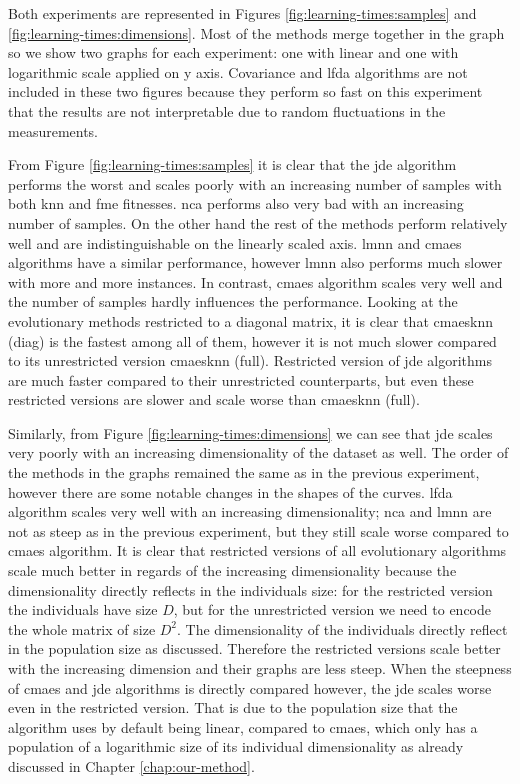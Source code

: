 \documentclass[12pt,a4paper]{report}
\begin{document}
Both experiments are represented in Figures \ref{fig:learning-times:samples} and \ref{fig:learning-times:dimensions}. Most of the methods merge together in the graph so we show two graphs for each experiment: one with linear and one with logarithmic scale applied on y axis. Covariance and \ac{lfda} algorithms are not included in these two figures because they perform so fast on this experiment that the results are not interpretable due to random fluctuations in the measurements.

From Figure \ref{fig:learning-times:samples} it is clear that the \ac{jde} algorithm performs the worst and scales poorly with an increasing number of samples with both \ac{knn} and \ac{fme} fitnesses. \ac{nca} performs also very bad with an increasing number of samples. On the other hand the rest of the methods perform relatively well and are indistinguishable on the linearly scaled axis. \ac{lmnn} and \ac{cmaes} algorithms have a similar performance, however \ac{lmnn} also performs much slower with more and more instances. In contrast, \ac{cmaes} algorithm scales very well and the number of samples hardly influences the performance. Looking at the evolutionary methods restricted to a diagonal matrix, it is clear that \ac{cmaesknn} (diag) is the fastest among all of them, however it is not much slower compared to its unrestricted version \ac{cmaesknn} (full). Restricted version of \ac{jde} algorithms are much faster compared to their unrestricted counterparts, but even these restricted versions are slower and scale worse than \ac{cmaesknn} (full).


Similarly, from Figure \ref{fig:learning-times:dimensions} we can see that \ac{jde} scales very poorly with an increasing dimensionality of the dataset as well. The order of the methods in the graphs remained the same as in the previous experiment, however there are some notable changes in the shapes of the curves. \ac{lfda} algorithm scales very well with an increasing dimensionality; \ac{nca} and \ac{lmnn} are not as steep as in the previous experiment, but they still scale worse compared to \ac{cmaes} algorithm. It is clear that restricted versions of all evolutionary algorithms scale much better in regards of the increasing dimensionality because the dimensionality directly reflects in the individuals size: for the restricted version the individuals have size $D$, but for the unrestricted version we need to encode the whole matrix of size $D^2$. The dimensionality of the individuals directly reflect in the population size as discussed. Therefore the restricted versions scale better with the increasing dimension and their graphs are less steep. When the steepness of \ac{cmaes} and \ac{jde} algorithms is directly compared however, the \ac{jde} scales worse even in the restricted version. That is due to the population size that the algorithm uses by default being linear, compared to \ac{cmaes}, which only has a population of a logarithmic size of its individual dimensionality as already discussed in Chapter \ref{chap:our-method}.
\end{document}
